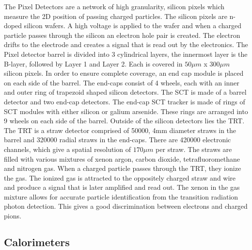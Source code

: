 \indent The Pixel Detectors are a network of high granularity, silicon pixels which measure the 2D position of passing charged particles. The silicon pixels are n-doped silicon wafers. A high voltage is applied to the wafer and when a charged particle passes through the silicon an electron hole pair is created. The electron drifts to the electrode and creates a signal that is read out by the electronics.  The Pixel detector barrel is divided into 3 cylindrical layers, the innermost layer is the B-layer, followed by Layer 1 and Layer 2. Each is covered in ${50\mu{m}}$ x ${300\mu{m}}$ silicon pixels. In order to ensure complete coverage, an end cap module is placed on each side of the barrel. The end-caps consist of 4 wheels, each with an inner and outer ring of trapezoid shaped silicon detectors. \linebreak
\indent The SCT is made of a barrel detector and two end-cap detectors. 
The end-cap SCT tracker is made of rings of SCT modules with either silicon or galium arsenide. These rings are arranged into 9 wheels on each side of the barrel.\linebreak
\indent Outside of the silicon detectors lies the TRT. The TRT is a straw detector comprised of 50000, 4mm diameter straws in the barrel and 320000 radial straws in the end-caps. There are 420000 electronic channels, which give a spatial resolution of ${170\mu{m}}$ per straw. The straws are filled with various mixtures of xenon argon, carbon dioxide, tetrafluoromethane and nitrogen gas. When a charged particle passes through the TRT, they ionize the gas. The ionized gas is attracted to the oppositely charged straw and wire and produce a signal that is later amplified and read out. The xenon in the gas mixture allows for accurate particle identification from the transition radiation photon detection.  This gives a good discrimination between electrons and charged pions.

\subsection{Calorimeters}\label{ssec:calo}

